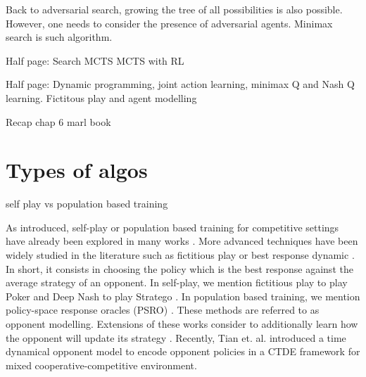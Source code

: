 Back to adversarial search, growing the tree of all possibilities is also possible.
However, one needs to consider the presence of adversarial agents.
Minimax search is such algorithm.





Half page:
Search
MCTS
MCTS with RL

Half page:
Dynamic programming, joint action learning, minimax Q and Nash Q learning.
Fictitous play and agent modelling

Recap chap 6 marl book


\section{Types of algos}\label{sec:ch6_algo}
self play vs population based training

As introduced, self-play or population based training for competitive settings have already been explored in many works \citep{jaderberg2019human, vinyals2019grandmaster, baker2019emergent}.
More advanced techniques have been widely studied in the literature such as fictitious play \cite{brown1951iterative} or best response dynamic \citep{baudin2022fictitious}.
In short, it consists in choosing the policy which is the best response against the average strategy of an opponent.
In self-play, we mention fictitious play to play Poker \citep{pmlr-v37-heinrich15} and Deep Nash to play Stratego \citep{DM_stratego}.
In population based training, we mention policy-space response oracles (PSRO) \citep{NIPS2017_3323fe11, Muller2020A}.
These methods are referred to as opponent modelling.
Extensions of these works consider to additionally learn how the opponent will update its strategy \citep{he2016opponent, foerster2017learning}.
Recently, Tian et. al. \citep{tian2022multi} introduced a time dynamical opponent model to encode opponent policies in a CTDE framework for mixed cooperative-competitive environment.